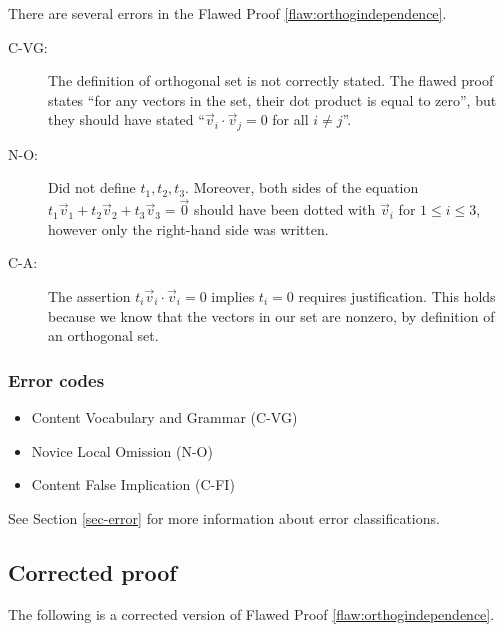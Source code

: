 There are several errors
 in the Flawed Proof \ref{flaw:orthogindependence}. %


 \begin{description}
 	\item[C-VG:] The definition of orthogonal set is not correctly stated. The flawed proof states ``for any vectors in the set, their dot product is equal to zero'', but they should have stated ``$\vec{v}_i \cdot \vec{v}_j = 0$ for all $i \neq j$''.
 	\item[N-O:] Did not define $t_1, t_2, t_3.$ Moreover, both sides of the equation $t_1\vec{v}_1 + t_2\vec{v}_2 + t_3\vec{v}_3 = \vec{0}$ should have been dotted with $\vec{v}_i$ for $1\leq i\leq 3$, however only the right-hand side was written.
 	\item[C-A:] The assertion $t_i\vec{v}_i \cdot \vec{v}_i=0$ implies $t_i=0$ requires justification. This holds because we know that the vectors in our set are nonzero, by definition of an orthogonal set.
 \end{description}


\subsubsection{Error codes}
\begin{itemize}
	\item 	Content Vocabulary and Grammar (C-VG)
	\item   Novice Local Omission (N-O)
	\item   Content False Implication (C-FI)
\end{itemize}
See Section \ref{sec-error} for more information about error classifications.

\clearpage
\subsection{Corrected proof}

The following is a corrected version of Flawed Proof \ref{flaw:orthogindependence}. %

